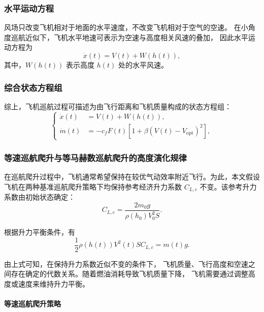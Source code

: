 \documentclass[UTF8]{ctexart}
\begin{document}
\subsubsection{水平运动方程}

风场只改变飞机相对于地面的水平速度，不改变飞机相对于空气的空速。
在小角度巡航近似下，飞机水平地速可表示为空速与高度相关风速的叠加，
因此水平运动方程为\cite{8}
\begin{equation}
    \dot x(t)=V(t)+W(h(t)),
    \label{eq:x_ode}
\end{equation}
其中，$W(h(t))$ 表示高度 $h(t)$ 处的水平风速。

\subsubsection{综合状态方程组}

综上，飞机巡航过程可描述为由飞行距离和飞机质量构成的状态方程组：
\begin{equation}
\left\{
\begin{aligned}
    \dot x(t) &= V(t)+W(h(t)),\\
    \dot m(t) &=
    -c_fF(t)
    \left[
    1+\beta\left(V(t)-V_{\mathrm{opt}}\right)^2
    \right],
\end{aligned}
\right.
\label{eq:state_system}
\end{equation}
\subsubsection{等速巡航爬升与等马赫数巡航爬升的高度演化规律}
在巡航爬升过程中，飞机通常希望保持在较优气动效率附近飞行。为此，本文假设飞机在两种基准巡航爬升策略下均保持参考经济升力系数 $C_{L,c}$ 不变。该参考升力系数由初始状态确定：
\begin{equation}
    C_{L,c}
    =
    \frac{2m_0g}{\rho(h_0)V_0^2S}.
    \label{eq:CLc}
\end{equation}

根据升力平衡条件，有
\begin{equation}
    \frac{1}{2}\rho(h(t))V^2(t)S C_{L,c}
    =
    m(t)g.
    \label{eq:lift_balance_cruise_climb}
\end{equation}

由上式可知，在保持升力系数近似不变的条件下，
飞机质量、飞行高度和空速之间存在确定的代数关系。随着燃油消耗导致飞机质量下降，
飞机需要通过调整高度或速度来维持升力平衡。

\paragraph{等速巡航爬升策略}
\end{document}
